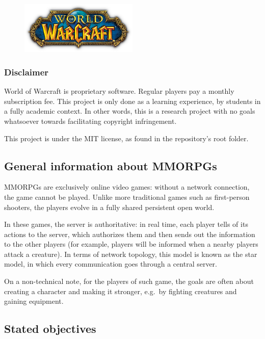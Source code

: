 \documentclass[paper=a4, fontsize=11pt]{scrartcl}
\begin{document}
\begin{figure}[htb!]
    \centering
    \includegraphics[width=0.5\textwidth]{wow}
\end{figure}

\FloatBarrier{}

\subsubsection{Disclaimer}

World of Warcraft is proprietary software.
Regular players pay a monthly subscription fee.
This project is only done as a learning experience, by students in a fully
academic context.
In other words, this is a research project with no goals whatsoever towards
facilitating copyright infringement.

This project is under the MIT license, as found in the repository's root folder.

\subsection{General information about MMORPGs}

MMORPGs are exclusively online video games: without a network connection, the
game cannot be played. Unlike more traditional games such as first-person
shooters, the players evolve in a fully shared persistent open world.

In these games, the server is authoritative: in real time, each player tells of
its actions to the server, which authorizes them and then sends out the
information to the other players (for example, players will be informed when a
nearby players attack a creature).
In terms of network topology, this model is known as the star model, in which
every communication goes through a central server.

On a non-technical note, for the players of such game, the goals are often about
creating a character and making it stronger, e.g.\ by fighting creatures and
gaining equipment.

\subsection{Stated objectives}
\end{document}

